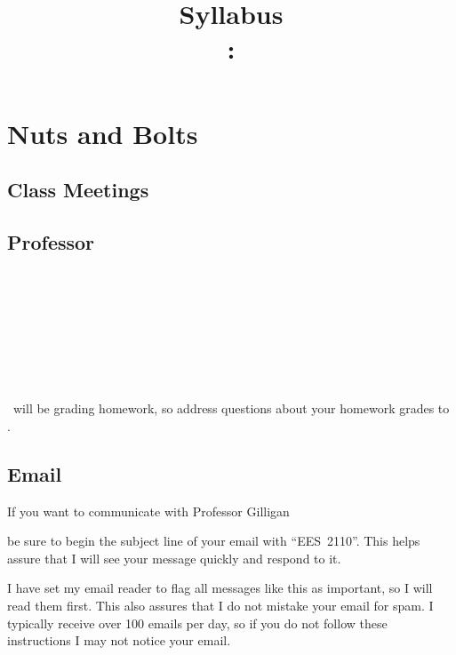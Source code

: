 \documentclass[11pt]{jgsyllabus}\usepackage[]{graphicx}\usepackage[]{xcolor}
\title{Syllabus\\
\ShortCourseNumber: \LongCourseName}
\begin{document}
\maketitle
\section[Nuts \& Bolts]{Nuts and Bolts}
\label{sec:NutsAndBolts}
\subsection{Class Meetings}
\ClassMeetings
\subsection{Professor}
\label{sec:Professor}
\ProfName\\
\ProfDescr\\
\ProfOffice\\
\ProfEmail\\
\ProfOfficeHours
%

\iffalse
\subsection{Teaching Assistant}
\label{sec:TA}
\TaName\\
\TaOfficeLoc\ifTaPhone , \TaPhone\fi\\
\TaEmail\\
\TaOfficeHours
\medskip

\noindent
\TaTitle\ will be grading homework, so address questions about your homework grades
to \TaAccusative.
\fi

\subsection{Email}
If you want to communicate with Professor Gilligan
\iffalse
or \TaTitle\
\fi
be sure to begin the
subject line of your email with ``{\scshape EES~2110}''. This helps assure
that I will see your message quickly and respond to it.

I have set my email reader to flag all messages like this as important, so I will read
them first. This also assures that I do not mistake your email for spam. I typically
receive over 100 emails per day, so if you do not follow these instructions I may not
notice your email.

\medskip
\clearpage
\end{document}
